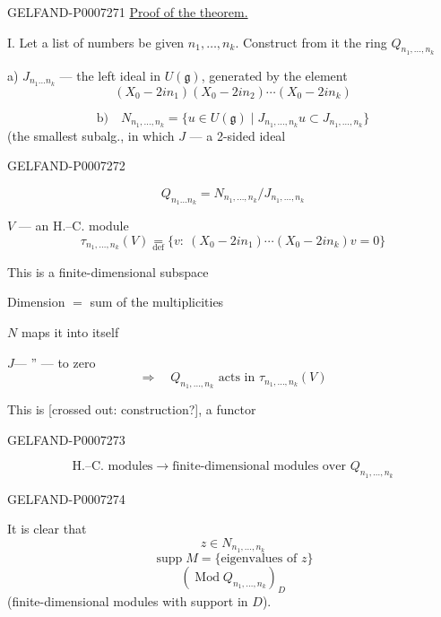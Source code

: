 \begin{GelfandAdjacentEvidence}{GELFAND-P000727}{1}
\underline{Proof of the theorem.}

I. Let a list of numbers be given \(n_1,\ldots,n_k\). Construct from it the ring \(Q_{n_1,\ldots,n_k}\)

a) \(J_{n_1\ldots n_k}\) --- the left ideal in \(U(\mathfrak g)\), generated by the element
\[
(X_0-2in_1)(X_0-2in_2)\cdots(X_0-2in_k)
\]

\[
\text{b)}\quad
N_{n_1,\ldots,n_k}=
\{u\in U(\mathfrak g)\mid
J_{n_1,\ldots,n_k}u\subset J_{n_1,\ldots,n_k}\}
\]
(the smallest subalg., in which \(J\) --- a 2-sided ideal
\end{GelfandAdjacentEvidence}
\begin{GelfandAdjacentEvidence}{GELFAND-P000727}{2}


\[
Q_{n_1\ldots n_k}=N_{n_1,\ldots,n_k}/J_{n_1,\ldots,n_k}
\]

\quad \(V\) --- an H.--C. module
\[
\tau_{n_1,\ldots,n_k}(V)\underset{\mathrm{def}}{=}
\{v:\ (X_0-2in_1)\cdots(X_0-2in_k)v=0\}
\]

This is a finite-dimensional subspace

Dimension \(={}\) sum of the multiplicities

\(N\) maps it into itself

\(J\)\quad --- '' --- \quad to zero
\[
\Rightarrow\quad Q_{n_1,\ldots,n_k}\text{ acts in }\tau_{n_1,\ldots,n_k}(V)
\]

This is [crossed out: construction?], a functor
\end{GelfandAdjacentEvidence}
\begin{GelfandAdjacentEvidence}{GELFAND-P000727}{3}

\[
\text{H.--C. modules}\longrightarrow
\text{finite-dimensional modules over }Q_{n_1,\ldots,n_k}
\]
\end{GelfandAdjacentEvidence}
\begin{GelfandAdjacentEvidence}{GELFAND-P000727}{4}


It is clear that
\[
z\in N_{n_1,\ldots,n_k}
\]
\[
\operatorname{supp} M=\{\text{eigenvalues of }z\}
\]
\[
(\operatorname{Mod} Q_{n_1,\ldots,n_k})_D
\]
(finite-dimensional modules with support in \(D\)).

\end{GelfandAdjacentEvidence}


